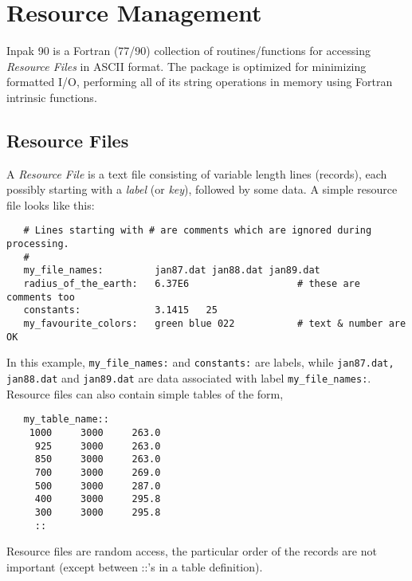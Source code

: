 \section{Resource Management}
Inpak 90 is a Fortran (77/90) collection of routines/functions for 
accessing {\em Resource Files} in ASCII format. 
The package is optimized for minimizing formatted I/O, performing all of 
its string operations in memory using Fortran intrinsic functions.
%  
\subsection{Resource Files}
%
A {\em Resource File} is a text file consisting of variable length lines 
(records), each possibly starting with a {\em label} (or {\em key}), 
followed by some data. 
A simple resource file looks like this:
%
\begin{verbatim}
   # Lines starting with # are comments which are ignored during processing.
   #
   my_file_names:         jan87.dat jan88.dat jan89.dat
   radius_of_the_earth:   6.37E6                   # these are comments too
   constants:             3.1415   25
   my_favourite_colors:   green blue 022           # text & number are OK
\end{verbatim}
%
In this example, {\tt my\_file\_names:} and {\tt constants:}
are labels, while {\tt jan87.dat, jan88.dat} and {\tt jan89.dat} are
data associated with label {\tt my\_file\_names:}.
Resource files can also contain simple tables of the form,
%
\begin{verbatim}
   my_table_name::
    1000     3000     263.0   
     925     3000     263.0
     850     3000     263.0
     700     3000     269.0
     500     3000     287.0
     400     3000     295.8
     300     3000     295.8    
     ::
\end{verbatim}
% 
Resource files are random access, the particular order of the
records are not important (except between ::'s in a table definition).
%
